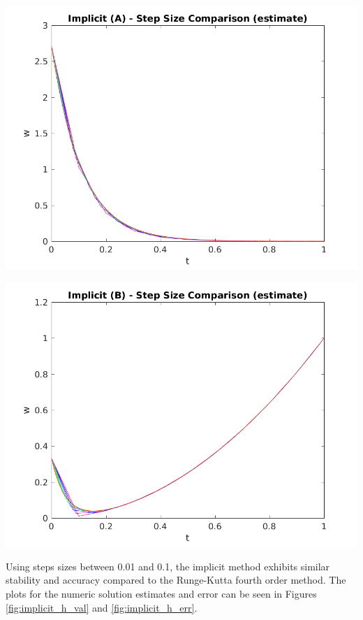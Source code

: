 \documentclass{article}
\begin{document}
\begin{center}
	\centering
    \begin{minipage}{0.5\textwidth}
        \centering
	    \includegraphics[width=1\textwidth]{../output/a_implicit_h_val.png}
    \end{minipage}\hfill
    \begin{minipage}{0.5\textwidth}
        \centering
	    \includegraphics[width=1\textwidth]{../output/b_implicit_h_val.png}
    \end{minipage}
 	\label{fig:implicit_h_val}
\end{center}

Using steps sizes between 0.01 and 0.1, the implicit method exhibits similar stability and accuracy compared to the Runge-Kutta fourth order method. The plots for the numeric solution estimates and error can be seen in Figures \ref{fig:implicit_h_val} and \ref{fig:implicit_h_err}.
\end{document}
